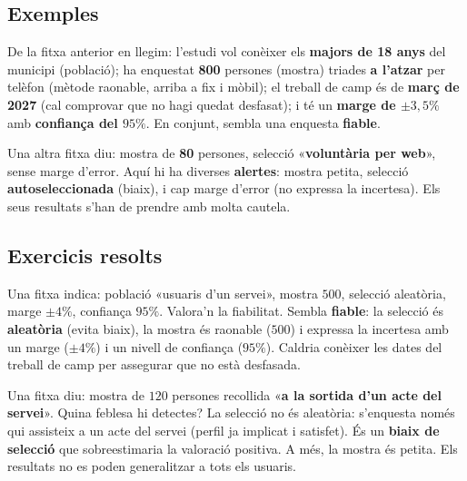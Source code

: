 \subsection{Exemples}

\begin{exemple}
De la fitxa anterior en llegim: l'estudi vol conèixer els \textbf{majors de 18 anys} del
municipi (població); ha enquestat \textbf{800} persones (mostra) triades \textbf{a l'atzar}
per telèfon (mètode raonable, arriba a fix i mòbil); el treball de camp és de \textbf{març
de 2027} (cal comprovar que no hagi quedat desfasat); i té un \textbf{marge de $\pm 3,5\%$}
amb \textbf{confiança del $95\%$}. En conjunt, sembla una enquesta \textbf{fiable}.
\end{exemple}

\begin{exemple}
Una altra fitxa diu: mostra de \textbf{80} persones, selecció «\textbf{voluntària per web}»,
sense marge d'error. Aquí hi ha diverses \textbf{alertes}: mostra petita, selecció
\textbf{autoseleccionada} (biaix), i cap marge d'error (no expressa la incertesa). Els seus
resultats s'han de prendre amb molta cautela.
\end{exemple}

\subsection{Exercicis resolts}

\begin{exresolt}
Una fitxa indica: població «usuaris d'un servei», mostra $500$, selecció aleatòria, marge
$\pm 4\%$, confiança $95\%$. Valora'n la fiabilitat.
\solucio
Sembla \textbf{fiable}: la selecció és \textbf{aleatòria} (evita biaix), la mostra és
raonable ($500$) i expressa la incertesa amb un marge ($\pm 4\%$) i un nivell de confiança
($95\%$). Caldria conèixer les dates del treball de camp per assegurar que no està
desfasada.
\end{exresolt}

\begin{exresolt}
Una fitxa diu: mostra de $120$ persones recollida «\textbf{a la sortida d'un acte del
servei}». Quina feblesa hi detectes?
\solucio
La selecció no és aleatòria: s'enquesta només qui assisteix a un acte del servei (perfil ja
implicat i satisfet). És un \textbf{biaix de selecció} que sobreestimaria la valoració
positiva. A més, la mostra és petita. Els resultats no es poden generalitzar a tots els
usuaris.
\end{exresolt}

